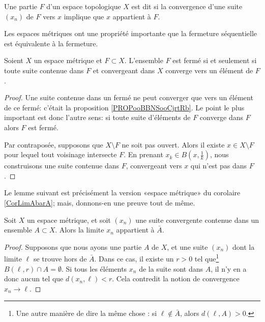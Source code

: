 \begin{definition}
	Une partie \( F\) d'un espace topologique \( X\) est dit  si la convergence d'une suite \( (x_n)\) de \( F\) vers \( x\) implique que \( x\) appartient à \( F\).
\end{definition}

Les espaces métriques ont une propriété importante que la fermeture séquentielle est équivalente à la fermeture.

\begin{proposition}    \label{PropLFBXIjt}
	Soient \( X\) un espace métrique et \( F\subset X\). L'ensemble \( F\) est fermé si et seulement si toute suite contenue dans \( F\) et convergeant dans \( X\) converge vers un élément de \( F\).
\end{proposition}

\begin{proof}
	Une suite contenue dans un fermé ne peut converger que vers un élément de ce fermé: c'était la proposition \ref{PROPooBBNSooCjrtRb}. Le point le plus important est donc l'autre sens: si toute suite d'éléments de \( F \) converge dans \( F \) alors \( F \) est fermé.

	Par contraposée, supposons que \( X\setminus F\) ne soit pas ouvert. Alors il existe \( x\in X\setminus F\) pour lequel tout voisinage intersecte \( F\). En prenant \( x_k\in B(x,\frac{1}{ k })\), nous construisons une suite contenue dans \( F\), convergeant vers \( x\) qui n'est pas dans \( F \).
\end{proof}


Le lemme suivant est précisément la version «espace métrique» du corolaire \ref{CorLimAbarA}; mais, donnons-en une preuve tout de même.
\begin{lemma}		\label{LemLimAbarA}
	Soit \( X\) un espace métrique, et soit \( (x_n)\) une suite convergente contenue dans un ensemble \( A\subset X\). Alors la limite \( x_n\) appartient à \( \bar A\).
\end{lemma}

\begin{proof}
	Supposons que nous ayons une partie \( A\) de \( X\), et une suite \( (x_n)\) dont la limite \( \ell\) se trouve hors de \( \bar A\). Dans ce cas, il existe un \( r>0\) tel que\footnote{Une autre manière de dire la même chose : si \( \ell\notin\bar A\), alors \( d(\ell,A)>0\).} \( B(\ell,r)\cap A=\emptyset\). Si tous les éléments \( x_n\) de la suite sont dans \( A\), il n'y en a donc aucun tel que \( d(x_n,\ell)<r\). Cela contredit la notion de convergence \( x_n\to \ell\).
\end{proof}

